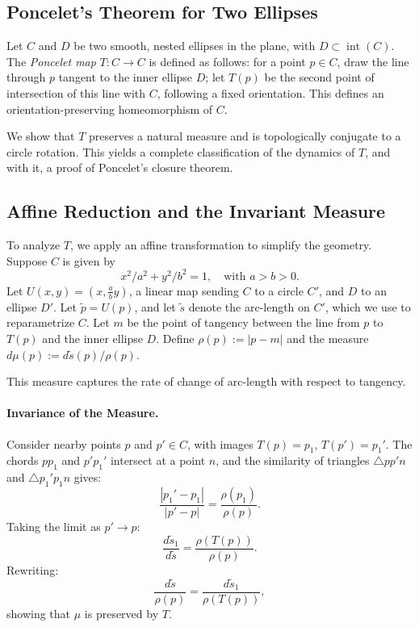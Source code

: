 \begin{technical}
\section*{Poncelet’s Theorem for Two Ellipses}

Let \( C \) and \( D \) be two smooth, nested ellipses in the plane, with \( D \subset \operatorname{int}(C) \). The \emph{Poncelet map} \( T: C \to C \) is defined as follows: for a point \( p \in C \), draw the line through \( p \) tangent to the inner ellipse \( D \); let \( T(p) \) be the second point of intersection of this line with \( C \), following a fixed orientation. This defines an orientation-preserving homeomorphism of \( C \).

We show that \( T \) preserves a natural measure and is topologically conjugate to a circle rotation. This yields a complete classification of the dynamics of \( T \), and with it, a proof of Poncelet's closure theorem.

\subsection*{Affine Reduction and the Invariant Measure}

To analyze \( T \), we apply an affine transformation to simplify the geometry. Suppose \( C \) is given by
\[
{x^2}/{a^2} + {y^2}/{b^2} = 1, \quad \text{with } a > b > 0.
\]
Let \( U(x, y) = (x, \frac{a}{b} y) \), a linear map sending \( C \) to a circle \( C' \), and \( D \) to an ellipse \( D' \). Let \( \tilde{p} = U(p) \), and let \( \tilde{s} \) denote the arc-length on \( C' \), which we use to reparametrize \( C \). Let \( m \) be the point of tangency between the line from \( p \) to \( T(p) \) and the inner ellipse \( D \). Define $\rho(p) := |p - m|$ and the measure $d\mu(p) := {d\tilde{s}(p)}/{\rho(p)}$.

This measure captures the rate of change of arc-length with respect to tangency.

\paragraph{Invariance of the Measure.} Consider nearby points \( p \) and \( p' \in C \), with images \( T(p) = p_1 \), \( T(p') = p_1' \). The chords \( pp_1 \) and \( p'p_1' \) intersect at a point \( n \), and the similarity of triangles \( \triangle pp'n \) and \( \triangle p_1'p_1n \) gives:
\[
\frac{|p_1' - p_1|}{|p' - p|} = \frac{\rho(p_1)}{\rho(p)}.
\]
Taking the limit as \( p' \to p \):
\[
\frac{d\tilde{s}_1}{d\tilde{s}} = \frac{\rho(T(p))}{\rho(p)}.
\]
Rewriting:
\[
\frac{d\tilde{s}}{\rho(p)} = \frac{d\tilde{s}_1}{\rho(T(p))},
\]
showing that \( \mu \) is preserved by \( T \).


\end{technical}
